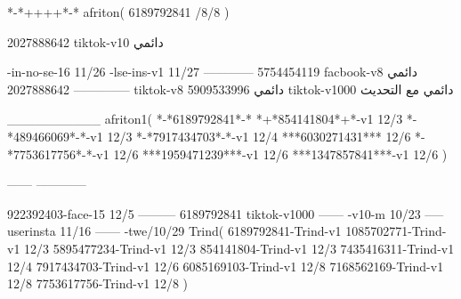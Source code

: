 *-*++++*-*
afriton(
6189792841 /8/8
)

2027888642 tiktok-v10
دائمي

-in-no-se-16 11/26
-lse-ins-v1 11/27
------------
5754454119 facbook-v8
دائمي
--------------
2027888642 tiktok-v8
دائمي
5909533996 tiktok-v1000
دائمي مع التحديث

__________
afriton1(
*-*6189792841*-*
*+*854141804*+*-v1 12/3
*-*489466069*-*-v1 12/3
*-*7917434703*-*-v1 12/4
***6030271431*** 12/6
*-*7753617756*-*-v1 12/6
***1959471239***-v1 12/6
***1347857841***-v1 12/6
)

------
------------


922392403-face-15 12/5
---------
6189792841 tiktok-v1000
------
-v10-m 10/23
-----
userinsta 11/16
------
-twe/10/29
Trind(
6189792841-Trind-v1 
1085702771-Trind-v1 12/3
5895477234-Trind-v1 12/3
854141804-Trind-v1 12/3
7435416311-Trind-v1 12/4
7917434703-Trind-v1 12/6
6085169103-Trind-v1 12/8
7168562169-Trind-v1 12/8
7753617756-Trind-v1 12/8
)
